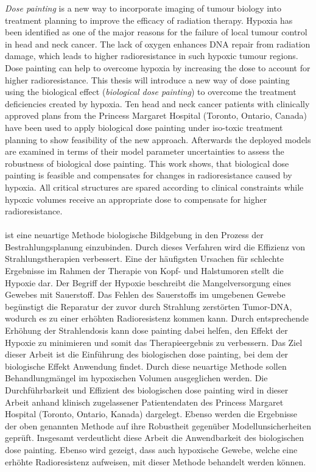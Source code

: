 
\textit{Dose painting} is a new way to incorporate imaging of tumour biology into treatment planning to improve the efficacy of radiation therapy.  Hypoxia has been identified as one of the major reasons for the failure of local tumour control in head and neck cancer. The lack of oxygen enhances DNA repair from radiation damage, which leads to higher radioresistance in such hypoxic tumour regions. Dose painting can help to overcome hypoxia by increasing the dose to account for higher radioresistance. This thesis will introduce a new way of dose painting using the biological effect (\textit{biological dose painting}) to overcome the treatment deficiencies created by hypoxia. Ten head and neck cancer patients with clinically approved plans from the Princess Margaret Hospital (Toronto, Ontario, Canada) have been used to apply biological dose painting under iso-toxic treatment planning to show feasibility of the new approach. Afterwards the deployed models are examined in terms of their model parameter uncertainties to assess the robustness of biological dose painting. This work shows, that biological dose painting is feasible and compensates for changes in radioresistance caused by hypoxia. All critical structures are spared according to clinical constraints while hypoxic volumes receive an appropriate dose to compensate for higher radioresistance.\\\\ ist eine neuartige Methode biologische Bildgebung in den Prozess der Bestrahlungsplanung einzubinden. Durch dieses Verfahren wird die Effizienz von Strahlungstherapien verbessert. Eine der h\"aufigsten Ursachen f\"ur schlechte Ergebnisse im Rahmen der Therapie von Kopf- und Halstumoren stellt die Hypoxie dar. Der Begriff der Hypoxie beschreibt die Mangelversorgung eines Gewebes mit Sauerstoff. Das Fehlen des Sauerstoffs im umgebenen Gewebe beg\"unstigt die Reparatur der zuvor durch Strahlung zerst\"orten Tumor-DNA, wodurch es zu einer erh\"ohten Radioresistenz kommen kann. Durch entsprechende Erh\"ohung der Strahlendosis kann dose painting dabei helfen, den Effekt der Hypoxie zu minimieren und somit das Therapieergebnis zu verbessern. Das Ziel dieser Arbeit ist die Einf\"uhrung des biologischen dose painting, bei dem der biologische Effekt Anwendung findet. Durch diese neuartige Methode sollen Behandlungm\"angel im hypoxischen Volumen ausgeglichen werden. Die Durchf\"uhrbarkeit und Effizient des biologischen dose painting wird in dieser Arbeit anhand klinisch zugelassener Patientendaten des Princess Margaret Hospital (Toronto, Ontario, Kanada) dargelegt. Ebenso werden die Ergebnisse der oben genannten Methode auf ihre Robustheit gegen\"uber Modellunsicherheiten gepr\"uft. Insgesamt verdeutlicht diese Arbeit die Anwendbarkeit des biologischen dose painting. Ebenso wird gezeigt, dass auch hypoxische Gewebe, welche eine erh\"ohte Radioresistenz aufweisen, mit dieser Methode behandelt werden k\"onnen.